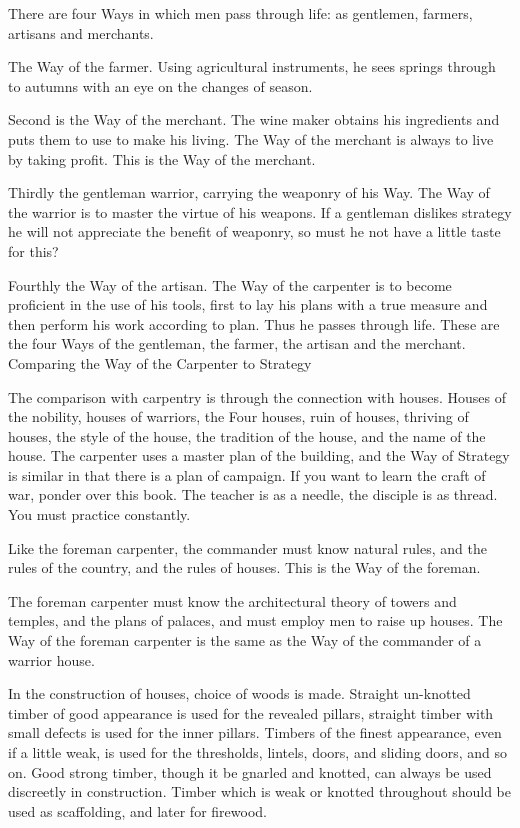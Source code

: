There are four Ways in which men pass through life: as gentlemen, farmers, artisans and merchants.

The Way of the farmer. Using agricultural instruments, he sees springs through to autumns with an eye on the changes of season.

Second is the Way of the merchant. The wine maker obtains his ingredients and puts them to use to make his living. The Way of the merchant is always to live by taking profit. This is the Way of the merchant.

Thirdly the gentleman warrior, carrying the weaponry of his Way. The Way of the warrior is to master the virtue of his weapons. If a gentleman dislikes strategy he will not appreciate the benefit of weaponry, so must he not have a little taste for this?

Fourthly the Way of the artisan. The Way of the carpenter is to become proficient in the use of his tools, first to lay his plans with a true measure and then perform his work according to plan. Thus he passes through life. These are the four Ways of the gentleman, the farmer, the artisan and the merchant.
Comparing the Way of the Carpenter to Strategy

The comparison with carpentry is through the connection with houses. Houses of the nobility, houses of warriors, the Four houses, ruin of houses, thriving of houses, the style of the house, the tradition of the house, and the name of the house. The carpenter uses a master plan of the building, and the Way of Strategy is similar in that there is a plan of campaign. If you want to learn the craft of war, ponder over this book. The teacher is as a needle, the disciple is as thread. You must practice constantly.

Like the foreman carpenter, the commander must know natural rules, and the rules of the country, and the rules of houses. This is the Way of the foreman.

The foreman carpenter must know the architectural theory of towers and temples, and the plans of palaces, and must employ men to raise up houses. The Way of the foreman carpenter is the same as the Way of the commander of a warrior house.

In the construction of houses, choice of woods is made. Straight un-knotted timber of good appearance is used for the revealed pillars, straight timber with small defects is used for the inner pillars. Timbers of the finest appearance, even if a little weak, is used for the thresholds, lintels, doors, and sliding doors, and so on. Good strong timber, though it be gnarled and knotted, can always be used discreetly in construction. Timber which is weak or knotted throughout should be used as scaffolding, and later for firewood.

